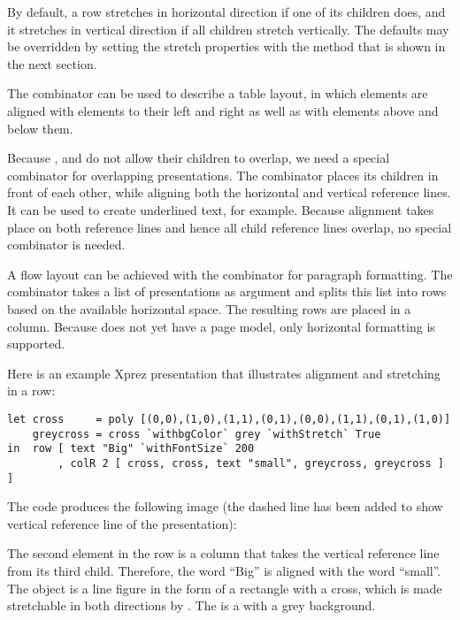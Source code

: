 By default, a row stretches in horizontal direction if one of its children does, and it stretches in vertical direction if all children stretch vertically. The defaults may be overridden by setting the stretch properties with the method that is  shown in the next section. 

The  combinator can be used to describe a table layout, in which elements are aligned with elements to their left and right as well as with elements above and below them. 

Because ,  and  do not allow their children to overlap, we need a special combinator for overlapping presentations. The  combinator places its children in front of each other, while aligning both the horizontal and vertical reference lines. It can be used to create underlined text, for example. Because alignment takes place on both reference lines and hence all child reference lines overlap, no special  combinator is needed. 

A flow layout can be achieved with the  combinator for paragraph formatting. The combinator takes a list of presentations as argument and splits this list into rows based on the available horizontal space. The resulting rows are placed in a column.  Because  does not yet have a page model, only horizontal formatting is supported.

Here is an example {\sc Xprez} presentation that illustrates alignment and stretching in a row:

\begin{small}
\begin{verbatim}
let cross     = poly [(0,0),(1,0),(1,1),(0,1),(0,0),(1,1),(0,1),(1,0)]
    greycross = cross `withbgColor` grey `withStretch` True
in  row [ text "Big" `withFontSize` 200
        , colR 2 [ cross, cross, text "small", greycross, greycross ] ] 
\end{verbatim}
\end{small}

The code produces the following image (the dashed line has been added to show vertical reference line of the presentation):

\begin{center}
\end{center}

The second element in the row is a column that takes the vertical reference line from its third child. Therefore, the word ``Big'' is aligned with the word ``small''. The  object is a line figure in the form of a rectangle with a cross, which is made stretchable in both directions by . The  is a  with a grey background. 
 
